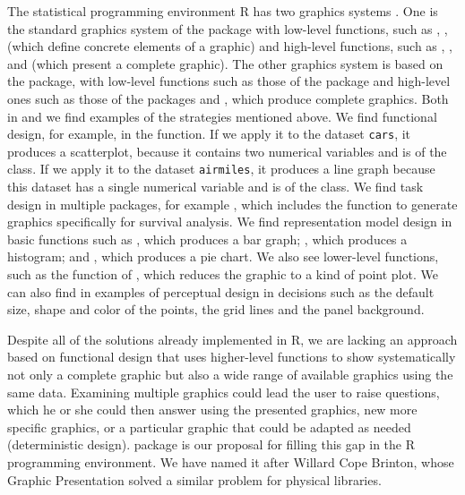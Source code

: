 The statistical programming environment R has two graphics systems \citep{Friendly2018}. One
is the standard graphics system of the package  with
low-level functions, such as , ,
 (which define concrete elements of a graphic) and
high-level functions, such as , , and
 (which present a complete graphic). The other graphics
system is based on the  package, with low-level functions such
as those of the  package \citep{Auguie2017} and
high-level ones such as those of the packages 
\citep{Sarkar2008} and  \citep{Wickham2016}, which produce
complete graphics. Both in  and  we find
examples of the strategies mentioned above. We find functional design,
for example, in the  function. If we apply it to the
dataset \texttt{cars}, it produces a scatterplot, because it contains
two numerical variables and is of the  class. If we
apply it to the dataset \texttt{airmiles}, it produces a line graph
because this dataset has a single numerical variable and is of the
 class. We find task design in multiple packages, for example
 \citep{Therneau2015}, which includes the function
 to generate graphics specifically for survival
analysis. We find representation model design in basic functions such as
, which produces a bar graph; , which
produces a histogram; and , which produces a pie chart. We
also see lower-level functions, such as the  function
of , which reduces the graphic to a kind of point plot. We
can also find in  examples of perceptual design in
decisions such as the default size, shape and color of the points, the
grid lines and the panel background.

Despite all of the solutions already implemented in R, we are
lacking an approach based on functional design that uses higher-level
functions to show systematically not only a complete graphic but also a
wide range of available graphics using the same data. Examining multiple
graphics could lead the user to raise questions, which he or she could
then answer using the presented graphics, new more specific graphics, or
a particular graphic that could be adapted as needed (deterministic
design).  package is our proposal for filling this gap in
the R programming environment. We have named it after Willard
Cope Brinton, whose Graphic Presentation \citep{Brinton1939} solved a
similar problem for physical libraries.

